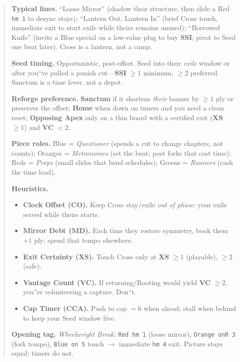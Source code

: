 \documentclass[11pt]{article}
\begin{document}
\begin{quote}
\medskip
\noindent\textbf{Typical lines.} ``Loose Mirror'' (shadow their structure, then slide a Red \texttt{hm 1} to desync stays); ``Lantern Out, Lantern In'' (brief Cross touch, immediate exit to start exile while theirs remains unused); ``Borrowed Knife'' (invite a Blue special on a low-value plug to buy \textbf{SSI}; pivot to Seed one beat later). Cross is a lantern, not a camp.

\medskip
\noindent\textbf{Seed timing.} Opportunistic, post-offset. Seed into their \emph{exile} window or after you``ve pulled a punish cut---\textbf{SSI} $\ge 1$ minimum, $\ge 2$ preferred. Sanctum is a time lever, not a depot.

\medskip
\noindent\textbf{Reforge preference.} \textbf{Sanctum} if it shortens \emph{their} banner by $\ge 1$ ply or preserves the offset; \textbf{Home} when down on timers  and you need a clean reset; \textbf{Opposing Apex} only on a thin board with a certified exit (\textbf{XS} $\ge 1$) and \textbf{VC} $< 2$.

\medskip
\noindent\textbf{Piece roles.} Blue = \emph{Questioner} (spends a cut to change chapters, not counts); Oranges = \emph{Metronomes} (set the beat; post forks that cost time); Reds = \emph{Props} (small slides that bend schedules); Greens = \emph{Runners} (cash the time lead).

\medskip
\noindent\textbf{Heuristics.}
\begin{itemize}[leftmargin=1.3em,itemsep=0.2em]
  \item \textbf{Clock Offset (CO).} Keep Cross stay/exile \emph{out of phase}: your exile served while theirs starts.
  \item \textbf{Mirror Debt (MD).} Each time they restore symmetry, book them $+1$ ply; spend that tempo elsewhere.
  \item \textbf{Exit Certainty (XS).} Touch Cross only at \textbf{XS} $\ge 1$ (playable), $\ge 2$ (safe).
  \item \textbf{Vantage Count (VC).} If returning/Rooting would yield \textbf{VC} $\ge 2$, you''re volunteering a capture. Don``t.
  \item \textbf{Cap Timer  (CCA).} Push to cap $=6$ when ahead; stall when behind to keep your Seed window live.
\end{itemize}

\medskip
\noindent\textbf{Opening tag.} \emph{Wheelwright Break:} \texttt{Red hm 1} (loose mirror), \texttt{Orange onR 3} (fork tempo), \texttt{Blue on 5} touch $\rightarrow$ immediate \texttt{hm 4} exit. Picture stays equal; timers do not.


\end{quote}
\end{document}
